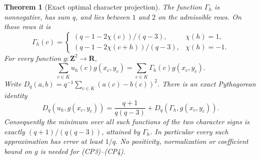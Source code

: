 \documentclass[11pt]{article}
\newtheorem{theorem}{Theorem}[section]
\begin{document}
\begin{theorem}[Exact optimal character projection]
\label{thm:optimal-character-projection}
The function \(\Gamma_h\) is nonnegative, has sum \(q\), and lies
between \(1\) and \(2\) on the admissible rows. On those rows it is
\[
 \Gamma_h(c)=
 \begin{cases}
 (q-1-2\chi(c))/(q-3),&\chi(h)=1,\\
 (q-1-2\chi(c+h))/(q-3),&\chi(h)=-1.
 \end{cases}
 \tag{CP2}
\]
For every function \(g:\mathbf Z^2\to\mathbf R\),
\[
 \sum_{c\in K}u_h(c)g(x_c,y_c)
       =\sum_{c\in K}\Gamma_h(c)g(x_c,y_c).
 \tag{CP3}
\]
Write \(D_q(a,b)=q^{-1}\sum_{c\in K}(a(c)-b(c))^2\).
There is an exact Pythagorean identity
\[
 D_q(u_h,g(x_c,y_c))
   =\frac{q+1}{q(q-3)}+D_q(\Gamma_h,g(x_c,y_c)).
 \tag{CP4}
\]
Consequently the minimum over \emph{all} such functions of the two
character signs is exactly \((q+1)/(q(q-3))\), attained by
\(\Gamma_h\). In particular every such approximation has error at least
\(1/q\). No positivity, normalization or coefficient bound on \(g\)
is needed for (CP3)--(CP4).
\end{theorem}
\end{document}
